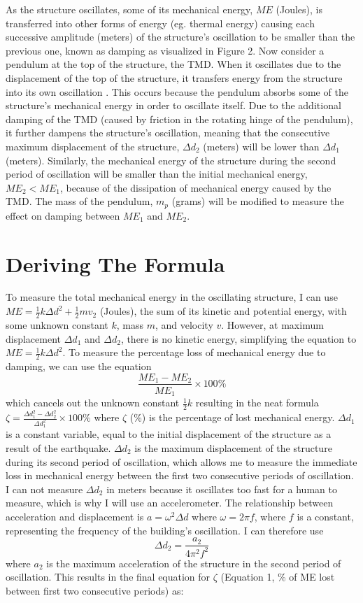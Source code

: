 \documentclass[11pt]{article}
\begin{document}
As the structure oscillates, some of its mechanical energy, $ME$ (Joules), is transferred into other forms of energy (eg. thermal energy) causing each successive amplitude (meters) of the structure’s oscillation to be smaller than the previous one, known as damping as visualized in Figure 2. Now consider a pendulum at the top of the structure, the TMD. When it oscillates due to the displacement of the top of the structure, it transfers energy from the structure into its own oscillation \autocite{connor}. This occurs because the pendulum absorbs some of the structure's mechanical energy in order to oscillate itself. Due to the additional damping of the TMD (caused by friction in the rotating hinge of the pendulum), it further dampens the structure’s oscillation, meaning that the consecutive maximum displacement of the structure, $\Delta d_2$ (meters) will be lower than $\Delta d_1$ (meters). Similarly, the mechanical energy of the structure during the second period of oscillation will be smaller than the initial mechanical energy, $ME_2 < ME_1$, because of the dissipation of mechanical energy caused by the TMD. The mass of the pendulum, $m_p$ (grams) will be modified to measure the effect on damping between $ME_1$ and $ME_2$.

\section{Deriving The Formula}

To measure the total mechanical energy in the oscillating structure, I can use $ME=\frac{1}{2}k\Delta d ^2+\frac{1}{2}mv_2$ (Joules), the sum of its kinetic and potential energy, with some unknown constant $k$, mass $m$, and velocity $v$. However, at maximum displacement $\Delta d_1$ and $\Delta d_2$, there is no kinetic energy, simplifying the equation to $ME=\frac{1}{2}k \Delta d^2$. To measure the percentage loss of mechanical energy due to damping, we can use the equation $$\frac{ME_1-ME_2}{ME_1}\times100\%$$ which cancels out the unknown constant $\frac{1}{2}k$ resulting in the neat formula $\zeta=\frac{\Delta d_1^2-\Delta d_2^2}{\Delta d_1^2}\times100\%$ where $\zeta$ (\%) is the percentage of lost mechanical energy.
$\Delta d_1$ is a constant variable, equal to the initial displacement of the structure as a result of the earthquake. $\Delta d_2$ is the maximum displacement of the structure during its second period of oscillation, which allows me to measure the immediate loss in mechanical energy between the first two consecutive periods of oscillation. I can not measure $\Delta d_2$ in meters because it oscillates too fast for a human to measure, which is why I will use an accelerometer. The relationship between acceleration and displacement is $a=\omega ^2 \Delta d$ where $\omega=2\pi f$, where $f$ is a constant, representing the frequency of the building’s oscillation. I can therefore use $$\Delta d_2=\frac{a_2}{4\pi^2f^2}$$ where $a_2$ is the maximum acceleration of the structure in the second period of oscillation. This results in the final equation for $\zeta$ (Equation 1, \% of ME lost between first two consecutive periods) as:
\end{document}
